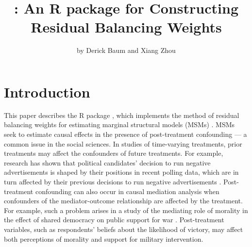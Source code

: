 \title{: An R package for Constructing Residual Balancing Weights}
\author{by Derick Baum and Xiang Zhou}

\maketitle


\hypertarget{intro}{%
\section{Introduction}\label{intro}}

This paper describes the R package , which implements the
method of residual balancing weights for estimating marginal structural
models (MSMs) \citep{zhouResidualBalancingMethod2020a}. MSMs seek to
estimate causal effects in the presence of post-treatment confounding
--- a common issue in the social sciences. In studies of time-varying
treatments, prior treatments may affect the confounders of future
treatments. For example, research has shown that political candidates'
decision to run negative advertisements is shaped by their positions in
recent polling data, which are in turn affected by their previous
decisions to run negative advertisements
\citep{lauEffectsNegativePolitical2007, blackwellFrameworkDynamicCausal2013}.
Post-treatment confounding can also occur in causal mediation analysis
when confounders of the mediator-outcome relationship are affected by
the treatment. For example, such a problem arises in a study of the
mediating role of morality in the effect of shared democracy on public
support for war \citep{tomzPublicOpinionDemocratic2013a}. Post-treatment
variables, such as respondents' beliefs about the likelihood of victory,
may affect both perceptions of morality and support for military
intervention.

